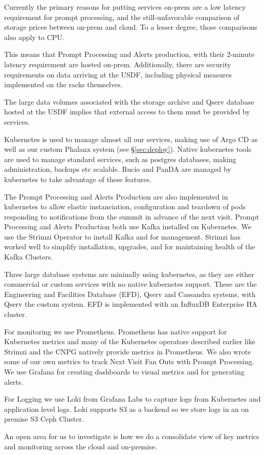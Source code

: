Currently the primary reasons for putting services on-prem are a low
latency requirement for prompt processing, and the still-unfavorable
comparison of storage prices between on-prem and cloud. To a lesser
degree, those comparisons also apply to CPU.

This means that Prompt Processing and Alerts production, with their
2-minute latency requirement are hosted on-prem. Additionally, there
are security requirements on data arriving at the USDF, including
physical measures implemented on the racks themselves.

The large data volumes associated with the storage archive and Qserv
database hosted at the USDF implies that external access to them must be
provided by services.

Kubernetes is used to manage almost all our services, making use of
Argo CD as well as our custom Phalanx system (see \S \ref{sec:deploy}).
Native kubernetes tools
are used to manage standard services, such as postgres databases,
making administration, backups etc scalable. Rucio and PanDA are
managed by kubernetes to take advantage of these features.

The Prompt Processing and Alerts Production are also implemented in
kubernetes to allow elastic instanciation, configuration and teardown of
pods responding to notifications from the summit in advance of the
next visit.
Prompt Processing and Alerts Production both use Kafka installed on Kubernetes.
We use the Strimzi Operator to install Kafka and for management.  Strimzi
has worked well to simplify installation, upgrades, and for maintaining
health of the Kafka Clusters.

Three large database systems are mininally using kubernetes, as they
are either commercial or custom services with no native kubernetes
support. These are the Engineering and Facilities Database (EFD),
Qserv and Cassandra systems, with Qserv the custom system. EFD is
implemented with an InfluxDB Enterprise HA cluster.

For monitoring we use Prometheus.  Prometheus has native support for
Kubernetes metrics and many of the Kubernetes operators described earlier
like Strimzi and the CNPG natively provide metrics in Prometheus. We also
wrote some of our own metrics to track Next Visit Fan Outs with Prompt Processing.
We use Grafana for creating dashboards to visual metrics and for generating alerts.

For Logging we use Loki from Grafana Labs to capture logs from Kubernetes
and application level logs.  Loki supports S3 as a backend so we store logs
in an on premise S3 Ceph Cluster.

An open area for us to investigate is how we do a consolidate view of key
metrics and monitoring across the cloud and on-premise.
